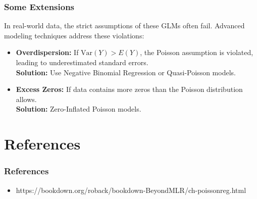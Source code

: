 \documentclass[10pt]{beamer} %
\begin{document}
\begin{frame}
    \frametitle{Some Extensions}
    In real-world data, the strict assumptions of these GLMs often fail. Advanced modeling techniques address these violations:
    
    \vspace{0.3cm}
    \begin{itemize}
        \item \textbf{Overdispersion:} If $\text{Var}(Y) > E(Y)$, the Poisson
           assumption is violated, leading to underestimated standard errors. \\
           \textbf{Solution:} Use Negative Binomial Regression or Quasi-Poisson
           models.
        \item \textbf{Excess Zeros:} If data contains more zeros than the
           Poisson distribution allows. \\
           \textbf{Solution:} Zero-Inflated Poisson models.
    \end{itemize}
\end{frame}


\section{References}

\begin{frame}
   \frametitle{References}
   \begin{itemize}
      \item https://bookdown.org/roback/bookdown-BeyondMLR/ch-poissonreg.html  
   \end{itemize}
\end{frame}
\end{document}
